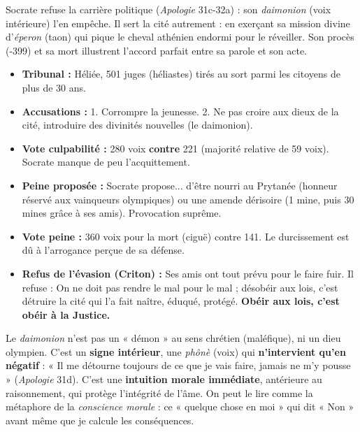 \documentclass[11pt]{article}
\begin{document}
Socrate refuse la carrière politique (\emph{Apologie} 31c-32a) : son \emph{daimonion} (voix intérieure) l'en empêche. Il sert la cité autrement : en exerçant sa mission divine d'\emph{éperon} (taon) qui pique le cheval athénien endormi pour le réveiller. Son procès (-399) et sa mort illustrent l'accord parfait entre sa parole et son acte.

\begin{exemplebox}
\begin{itemize}
    \item \textbf{Tribunal :} Héliée, 501 juges (héliastes) tirés au sort parmi les citoyens de plus de 30 ans.
    \item \textbf{Accusations :} 1. Corrompre la jeunesse. 2. Ne pas croire aux dieux de la cité, introduire des divinités nouvelles (le daimonion).
    \item \textbf{Vote culpabilité :} 280 voix \textbf{contre} 221 (majorité relative de 59 voix). Socrate manque de peu l'acquittement.
    \item \textbf{Peine proposée :} Socrate propose... d'être nourri au Prytanée (honneur réservé aux vainqueurs olympiques) ou une amende dérisoire (1 mine, puis 30 mines grâce à ses amis). Provocation suprême.
    \item \textbf{Vote peine :} 360 voix pour la mort (ciguë) contre 141. Le durcissement est dû à l'arrogance perçue de sa défense.
    \item \textbf{Refus de l'évasion (Criton) :} Ses amis ont tout prévu pour le faire fuir. Il refuse : \og On ne doit pas rendre le mal pour le mal \fg{} ; désobéir aux lois, c'est détruire la cité qui l'a fait naître, éduqué, protégé. \textbf{Obéir aux lois, c'est obéir à la Justice.}
\end{itemize}
\end{exemplebox}

\begin{savaistu}
Le \emph{daimonion} n'est pas un « démon » au sens chrétien (maléfique), ni un dieu olympien. C'est un \textbf{signe intérieur}, une \emph{phônè} (voix) qui \textbf{n'intervient qu'en négatif} : « Il me détourne toujours de ce que je vais faire, jamais ne m'y pousse » (\emph{Apologie} 31d). C'est une \textbf{intuition morale immédiate}, antérieure au raisonnement, qui protège l'intégrité de l'âme. On peut le lire comme la métaphore de la \emph{conscience morale} : ce « quelque chose en moi » qui dit « Non » avant même que je calcule les conséquences.
\end{savaistu}
\end{document}
